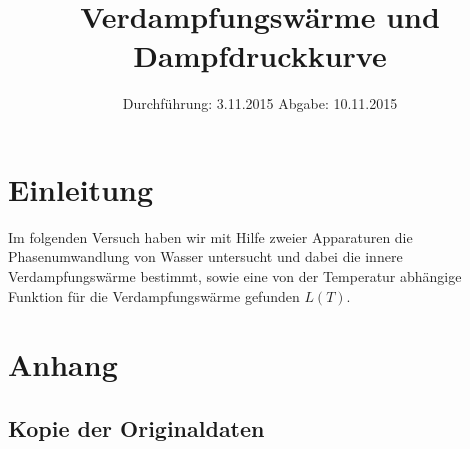 

\subject{V 203}
\title{Verdampfungswärme und Dampfdruckkurve}
\date{
  Durchführung: 3.11.2015
  \hspace{3em}
  Abgabe: 10.11.2015
}



\maketitle
\thispagestyle{empty}
\tableofcontents
\newpage

\section{Einleitung}
Im folgenden Versuch haben wir mit Hilfe zweier Apparaturen die Phasenumwandlung von Wasser untersucht und dabei die innere Verdampfungswärme
bestimmt, sowie eine von der Temperatur abhängige Funktion für die Verdampfungswärme gefunden $L(T)$.




\section{Anhang}
\subsection{Kopie der Originaldaten}
\newpage

\nocite{*}

\printbibliography


